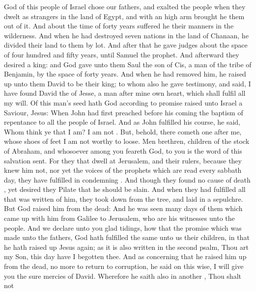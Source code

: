 {God of
this
people of
Israel
chose
our
fathers,
and
exalted the
people
when they dwelt as
strangers
in the
land of
Egypt,
and
with an
high
arm brought
he
them
out of
it.
And
about the
time of forty
years suffered
he their
manners
in the
wilderness.
And when he had
destroyed
seven
nations
in the
land of
Chanaan, he
divided
their
land to
them by
lot.
And
after
that he
gave
{}
judges about the space
of four
hundred
and
fifty
years,
until
Samuel the
prophet.
And
afterward they
desired a
king:
and
God
gave unto
them
Saul the
son of
Cis, a
man
of the
tribe of
Benjamin, by the space of
forty
years.
And when he had
removed
him, he raised
up unto
them
David to
be their
king; to
whom
also he gave
testimony, and
said, I have
found
David
the
{} of
Jesse, a
man
after mine
own
heart,
which shall
fulfil
all
my
will.
Of this
man’s
seed
hath
God according
to
{}
promise
raised unto
Israel a
Saviour,
Jesus:
When
John had first
preached
before
his
coming the
baptism of
repentance to
all the
people of
Israel.
And
as
John
fulfilled his
course, he
said,
Whom think ye
that
I
am?
I
am
not
{}.
But,
behold, there cometh
one
after
me,
whose
shoes
of
{}
feet I
am
not
worthy to
loose.
Men
{}
brethren,
children of the
stock of
Abraham,
and
whosoever
among
you
feareth
God, to
you
is the
word of
this
salvation
sent.
For they that
dwell
at
Jerusalem,
and
their
rulers, because they
knew
him
not, nor
yet the
voices of the
prophets
which are
read
every sabbath
day, they have
fulfilled
{} in
condemning
{}.
And though they
found
no
cause of
death
{}, yet desired
they
Pilate that
he should be
slain.
And
when they had
fulfilled
all that was
written
of
him, they
took
{}
down
from the
tree, and
laid
{}
in a
sepulchre.
But
God
raised
him
from the
dead:
And he was
seen
many
days of them which came up
with
him
from
Galilee
to
Jerusalem,
who
are
his
witnesses
unto the
people.
And
we
declare unto
you glad
tidings, how that the
promise which was
made
unto the
fathers,
God hath
fulfilled the
same unto
us
their
children, in that he hath raised
up
Jesus
again;
as it
is
also
written
in the
second
psalm,
Thou
art
my
Son, this
day
have
I
begotten
thee.
And as concerning
that he
raised
him
up
from the
dead,
{} no
more
to
return
to
corruption, he
said on this
wise, I will
give
you the
sure
mercies of
David.
Wherefore he
saith
also
in
another
{}, Thou
shalt
not
}
